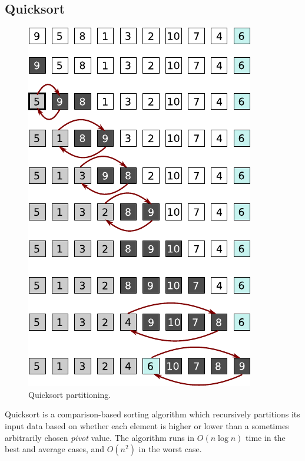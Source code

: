 \documentclass[12pt, a4paper]{article}
\begin{document}
\subsection{Quicksort}\label{sec:quicksort}

\begin{figure}
    \centering
    \includegraphics{figures/quicksort.pdf}
    \caption{\label{fig:quicksort_1}Quicksort partitioning.}
\end{figure}

Quicksort is a comparison-based sorting algorithm which recursively partitions its input data based on whether each element is higher or lower than a sometimes arbitrarily chosen \emph{pivot} value. The algorithm runs in $O(n\log n)$ time in the best and average cases, and $O (n^{2})$ in the worst case.
\end{document}
